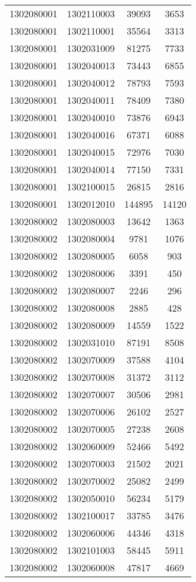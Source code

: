 \begin{longtable}{llcc}
1302080001 & 1302110003 & 39093 & 3653\\
1302080001 & 1302110001 & 35564 & 3313\\
1302080001 & 1302031009 & 81275 & 7733\\
1302080001 & 1302040013 & 73443 & 6855\\
1302080001 & 1302040012 & 78793 & 7593\\
1302080001 & 1302040011 & 78409 & 7380\\
1302080001 & 1302040010 & 73876 & 6943\\
1302080001 & 1302040016 & 67371 & 6088\\
1302080001 & 1302040015 & 72976 & 7030\\
1302080001 & 1302040014 & 77150 & 7331\\
1302080001 & 1302100015 & 26815 & 2816\\
1302080001 & 1302012010 & 144895 & 14120\\
1302080002 & 1302080003 & 13642 & 1363\\
1302080002 & 1302080004 & 9781 & 1076\\
1302080002 & 1302080005 & 6058 & 903\\
1302080002 & 1302080006 & 3391 & 450\\
1302080002 & 1302080007 & 2246 & 296\\
1302080002 & 1302080008 & 2885 & 428\\
1302080002 & 1302080009 & 14559 & 1522\\
1302080002 & 1302031010 & 87191 & 8508\\
1302080002 & 1302070009 & 37588 & 4104\\
1302080002 & 1302070008 & 31372 & 3112\\
1302080002 & 1302070007 & 30506 & 2981\\
1302080002 & 1302070006 & 26102 & 2527\\
1302080002 & 1302070005 & 27238 & 2608\\
1302080002 & 1302060009 & 52466 & 5492\\
1302080002 & 1302070003 & 21502 & 2021\\
1302080002 & 1302070002 & 25082 & 2499\\
1302080002 & 1302050010 & 56234 & 5179\\
1302080002 & 1302100017 & 33785 & 3476\\
1302080002 & 1302060006 & 44346 & 4318\\
1302080002 & 1302101003 & 58445 & 5911\\
1302080002 & 1302060008 & 47817 & 4669\\

\end{longtable}
